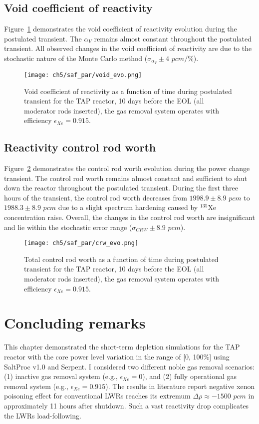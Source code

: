 \subsection{Void coefficient of reactivity}
Figure~\ref{fig:lf-tap-void-evo} demonstrates the void coefficient of 
reactivity evolution during the postulated transient. 
The $\alpha_V$ remains almost constant throughout the postulated transient. 
All observed changes in the void coefficient of reactivity are due to the
stochastic nature of the Monte Carlo method ($\sigma_{\alpha_V}\pm4$ $pcm/$\%).
\begin{figure}[htp!] %
	\centering
	\texttt{[image: ch5/saf\_par/void\_evo.png]}
	\caption{Void coefficient of reactivity as a function of time during 
	postulated transient for the \gls{TAP} reactor, 10 days before the 
	\gls{EOL} (all moderator rods inserted), the gas removal system operates 
	with efficiency $\epsilon_{Xe}=0.915$.}
	\label{fig:lf-tap-void-evo}
\end{figure}

\subsection{Reactivity control rod worth}
Figure~\ref{fig:lf-tap-crw-evo} demonstrates the control rod worth evolution 
during the power change transient. The control rod worth remains almost 
constant and sufficient to shut down the reactor throughout the postulated 
transient. During the first three hours of the transient, the control rod 
worth decreases from $1998.9\pm8.9$ $pcm$ to $1988.3\pm8.9$ $pcm$ due to a 
slight spectrum hardening caused by $^{135}$Xe concentration raise. Overall, 
the changes in the control rod worth are insignificant and lie within the 
stochastic error range ($\sigma_{CRW}\pm8.9$ $pcm$).
\begin{figure}[htp!] %
	\centering
	\texttt{[image: ch5/saf\_par/crw\_evo.png]}
	\caption{Total control rod worth as a function of time during postulated 
	transient for the \gls{TAP} reactor, 10 days before the \gls{EOL} (all 
	moderator rods inserted), the gas removal system operates with efficiency 
	$\epsilon_{Xe}=0.915$.}
	\label{fig:lf-tap-crw-evo}
\end{figure}


\section{Concluding remarks}
This chapter demonstrated the short-term depletion simulations for the 
\gls{TAP} reactor with the core power level variation in the range of [0, 
100\%] using SaltProc v1.0 and Serpent. I considered two different noble gas 
removal scenarios: (1) inactive gas removal system (e.g., $\epsilon_{Xe}=0$), 
and (2) fully operational gas removal system (e.g., $\epsilon_{Xe}=0.915$). 
The results in literature report negative xenon poisoning effect for 
conventional \glspl{LWR} reaches its extremum $\Delta\rho\approx-1500$ $pcm$ 
in approximately 11 hours after shutdown. Such a vast reactivity drop 
complicates the \glspl{LWR} load-following.

